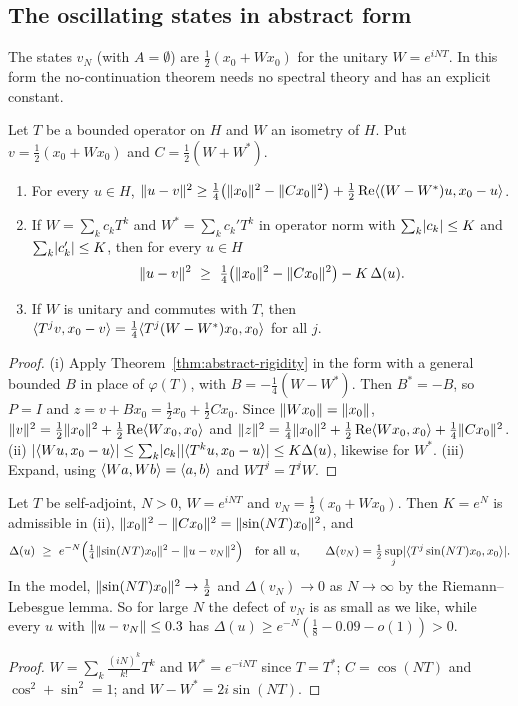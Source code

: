 \subsection{The oscillating states in abstract form}\label{ssec:abstract-nogo}

The states $v_N$ (with $A=\emptyset$) are $\frac12(x_0+Wx_0)$ for the unitary
$W=e^{iNT}$. In this form the no-continuation theorem needs no spectral theory and has an
explicit constant.

\begin{theorem}\label{thm:abstract-nogo}
\stproved{} 
Let $T$ be a bounded operator on $H$ and $W$ an isometry of $H$. Put $v=\frac12(x_0+Wx_0)$ and
$C=\frac12(W+W^*)$.
\begin{enumerate}[label=(\roman*)]
\item For every $u\in H$,
$\lVert u-v\rVert^2\ge\frac14\bigl(\lVert x_0\rVert^2-\lVert Cx_0\rVert^2\bigr)
+\frac12\operatorname{Re}\langle (W-W^*)u,x_0-u\rangle$.
\item If $W=\sum_kc_kT^k$ and $W^*=\sum_kc_k'T^k$ in operator norm with
$\sum_k\lvert c_k\rvert\le K$ and $\sum_k\lvert c_k'\rvert\le K$, then for every $u\in H$
\[
\norm{u-v}^2\ \ge\ \tfrac14\bigl(\norm{x_0}^2-\norm{Cx_0}^2\bigr)-K\,\Delta(u).
\]
\item If $W$ is unitary and commutes with $T$, then
$\langle T^jv,x_0-v\rangle=\frac14\langle T^j(W-W^*)x_0,x_0\rangle$ for all $j$.
\end{enumerate}
\end{theorem}
\begin{proof}
(i) Apply Theorem~\ref{thm:abstract-rigidity} in the form with a general bounded $B$ in place
of $\varphi(T)$, with $B=-\frac14(W-W^*)$. Then $B^*=-B$, so $P=I$ and $z=v+Bx_0
=\frac12x_0+\frac12Cx_0$. Since $\lVert Wx_0\rVert=\lVert x_0\rVert$,
$\lVert v\rVert^2=\frac12\lVert x_0\rVert^2+\frac12\operatorname{Re}\langle Wx_0,x_0\rangle$ and
$\lVert z\rVert^2=\frac14\lVert x_0\rVert^2+\frac12\operatorname{Re}\langle Wx_0,x_0\rangle+\frac14\lVert Cx_0\rVert^2$.
(ii) $\lvert \langle Wu,x_0-u\rangle\rvert\le\sum_k\lvert c_k\rvert\lvert \langle T^ku,x_0-u\rangle\rvert\le K\Delta(u)$, likewise for
$W^*$. (iii) Expand, using $\langle Wa,Wb\rangle=\langle a,b\rangle$ and $WT^j=T^jW$.
\end{proof}

\begin{corollary}\label{cor:explicit-nogo}\stproved{}
Let $T$ be self-adjoint, $N>0$, $W=e^{iNT}$ and $v_N=\frac12(x_0+Wx_0)$. Then
$K=e^{N}$ is admissible in (ii), $\lVert x_0\rVert^2-\lVert Cx_0\rVert^2=\lVert \sin(NT)x_0\rVert^2$, and
\[
\Delta(u)\ \ge\ e^{-N}\Bigl(\tfrac14\norm{\sin(NT)x_0}^2-\norm{u-v_N}^2\Bigr)
\quad\text{for all }u,\qquad
\Delta(v_N)=\tfrac12\sup_j\abs{\ip{T^j\sin(NT)x_0}{x_0}} .
\]
In the model, $\lVert \sin(NT)x_0\rVert^2\to\frac12$ and $\Delta(v_N)\to0$ as $N\to\infty$ by the
Riemann--Lebesgue lemma. So for large $N$ the defect of $v_N$ is as small as we like, while
every $u$ with $\lVert u-v_N\rVert\le0.3$ has $\Delta(u)\ge e^{-N}(\frac18-0.09-o(1))>0$.
\end{corollary}
\begin{proof}
$W=\sum_k\frac{(iN)^k}{k!}T^k$ and $W^*=e^{-iNT}$ since $T=T^*$; $C=\cos(NT)$ and
$\cos^2+\sin^2=1$; and $W-W^*=2i\sin(NT)$.
\end{proof}

